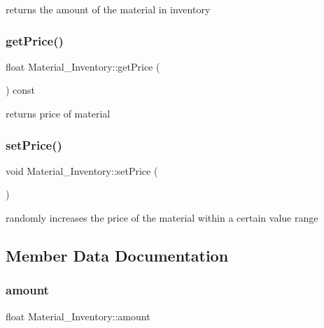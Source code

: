 returns the amount of the material in inventory 

\mbox{\label{classMaterial__Inventory_a3e3bf78a963137fdf3be88cecbdcb778}} 
\subsubsection{\texorpdfstring{get\+Price()}{getPrice()}}
{\footnotesize\ttfamily float Material\+\_\+\+Inventory\+::get\+Price (\begin{DoxyParamCaption}{ }\end{DoxyParamCaption}) const}



returns price of material 

\mbox{\label{classMaterial__Inventory_a1ae3a7d9e3d42c8d5bfee551605722ee}} 
\subsubsection{\texorpdfstring{set\+Price()}{setPrice()}}
{\footnotesize\ttfamily void Material\+\_\+\+Inventory\+::set\+Price (\begin{DoxyParamCaption}{ }\end{DoxyParamCaption})}



randomly increases the price of the material within a certain value range 



\subsection{Member Data Documentation}
\mbox{\label{classMaterial__Inventory_a928c45234f051861431e8adc1bd4f368}} 
\subsubsection{\texorpdfstring{amount}{amount}}
{\footnotesize\ttfamily float Material\+\_\+\+Inventory\+::amount\hspace{0.3cm}{\ttfamily [private]}}



